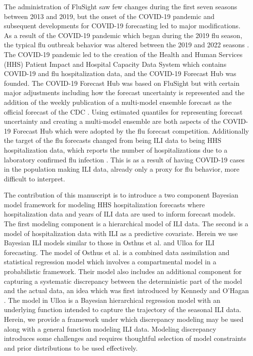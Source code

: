 The administration of FluSight saw few changes during the first seven seasons
between 2013 and 2019, 
but the onset of the COVID-19 pandemic and subsequent developments for COVID-19 
forecasting led to major modifications. As a result of the COVID-19 pandemic 
which began during the 2019 flu season, the typical flu outbreak behavior was 
altered between the 2019 and 2022 seasons \cite[]{mathis2024evaluation}. 
The COVID-19 pandemic led to the creation of the Health and Human Services 
(HHS) Patient Impact and Hospital Capacity Data System 
\cite[]{healthdata2024covidts} which contains COVID-19 and flu hospitalization 
data, and the COVID-19 Forecast Hub was founded. The COVID-19 Forecast Hub 
was based on FluSight but with certain major adjustments including how the 
forecast uncertainty is represented and the addition of the weekly publication 
of a multi-model ensemble forecast as the official forecast of the CDC 
\cite[]{bracher2021evaluating, Cramer2022-hub-dataset}. Using estimated 
quantiles for representing forecast uncertainty and creating a multi-model 
ensemble are both aspects of the COVID-19 Forecast Hub which were adopted by 
the flu forecast competition. Additionally the target of the flu forecasts 
changed from being ILI data to being HHS hospitalization data, which reports 
the number of hospitalizations due to a laboratory confirmed flu infection  
\cite[]{mathis2024evaluation,healthdata2024covidts}. This is as a result of 
having COVID-19 cases in the population making ILI data, already only a proxy 
for flu behavior, more difficult to interpret.



The contribution of this manuscript is to introduce a two component 
Bayesian model framework 
for modeling HHS hospitalization forecasts where hospitalization data and 
years of ILI data are used to inform forecast models. The first modeling 
component is a hierarchical model of ILI data. 
The second is a model of hospitalization 
data with ILI as a predictive covariate.
Herein we use Bayesian ILI models similar to those in Osthus et al. 
\cite[]{osthus2019dynamic} and Ulloa \cite[]{ulloa2019} for ILI forecasting.
The model of Osthus et al. \cite[]{osthus2019dynamic} is a combined data 
assimilation and statistical regression model which involves a compartmental 
model in a probabilistic framework. Their model also includes an additional 
component for capturing a systematic discrepancy between the deterministic 
part of the model and the actual data, an idea which was first introduced by 
Kennedy and O'Hagan \cite[]{kennedy2001bayesian}. The model in Ulloa 
\cite[]{ulloa2019} is a Bayesian hierarchical regression model with an 
underlying function intended to capture the trajectory of the seasonal 
ILI data. Herein, we provide a framework under which discrepancy modeling may 
be used along with a general function modeling ILI data. Modeling discrepancy
introduces some challenges and requires thoughtful selection of model 
constraints and prior distributions to be used effectively.
 

